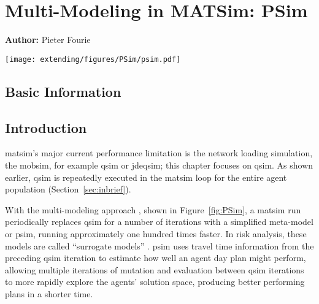 \chapter{Multi-Modeling in MATSim: PSim}
\label{ch:psim}

\hfill \textbf{Author:} Pieter Fourie

\begin{center} \texttt{[image: extending/figures/PSim/psim.pdf]} \end{center}


\section{Basic Information}
\section{Introduction}
\gls{matsim}'s major current performance limitation is the network loading simulation, \ie the \gls{mobsim}, for example \gls{qsim} or \gls{jdeqsim}; 
this chapter focuses on \gls{qsim}. 
As shown earlier, \gls{qsim} is repeatedly executed in the \gls{matsim} loop for the entire agent population (Section~\ref{sec:inbrief}).

With the multi-modeling approach \citep[][]{FourieEtAl_TRR_2013}, shown in Figure~\ref{fig:PSim}, a \gls{matsim} run periodically replaces \gls{qsim} for a number of iterations with a simplified meta-model or \gls{psim}, running approximately one hundred times faster. 
In risk analysis, these models are called ``surrogate models'' \citep[][]{Sudret_APSSRA_2012}. 
\gls{psim} uses travel time information from the preceding \gls{qsim} iteration to estimate how well an agent day plan might perform, allowing multiple iterations of mutation and evaluation between \gls{qsim} iterations to more rapidly explore the agents' solution space, producing better performing plans in a shorter time.

